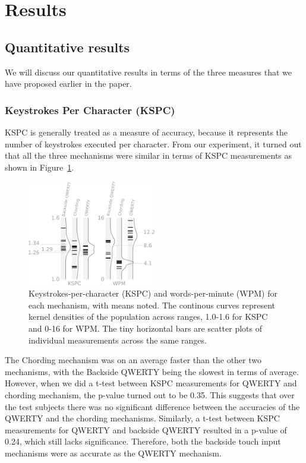 \section{Results}
\subsection{Quantitative results}

We will discuss our quantitative results in terms of the three
measures that we have proposed earlier in the paper.

\subsubsection{Keystrokes Per Character (KSPC)}

KSPC is generally treated as a measure of accuracy, because it
represents the number of keystrokes executed per character. From our
experiment, it turned out that all the three mechanisms were similar
in terms of KSPC measurements as shown in
Figure~\ref{fig:kspc_and_wpm}.

\begin{figure}
    \includegraphics[width=0.5\textwidth]{Figures/kspc_and_wpm.pdf} 
    \caption{Keystrokes-per-character (KSPC) and words-per-minute (WPM) for each mechanism, with means noted. The continous curves represent kernel densities of the population across ranges, 1.0-1.6 for KSPC and 0-16 for WPM. The tiny horizontal bars are scatter plots of individual measurements across the same ranges.}
    \label{fig:kspc_and_wpm}
\end{figure}

The Chording mechanism was on an average faster than the other two
mechanisms, with the Backside QWERTY being the slowest in terms of
average. However, when we did a t-test between KSPC measurements for
QWERTY and chording mechanism, the p-value turned out to be 0.35. This
suggests that over the test subjects there was no significant
difference between the accuracies of the QWERTY and the chording
mechanisms. Similarly, a t-test between KSPC measurements for QWERTY
and backside QWERTY resulted in a p-value of 0.24, which still lacks
significance. Therefore, both the backside touch input mechanisms were
as accurate as the QWERTY mechanism.

